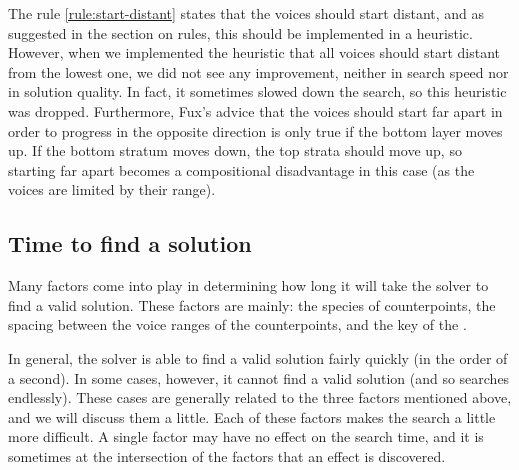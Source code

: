 The rule \ref{rule:start-distant} states that the voices should start distant, and as suggested in the section on rules, this should be implemented in a heuristic. However, when we implemented the heuristic that all voices should start distant from the lowest one, we did not see any improvement, neither in search speed nor in solution quality. In fact, it sometimes slowed down the search, so this heuristic was dropped. Furthermore, Fux's advice that the voices should start far apart in order to progress in the opposite direction is only true if the bottom layer moves up. If the bottom stratum moves down, the top strata should move up, so starting far apart becomes a compositional disadvantage in this case (as the voices are limited by their range).



\subsection{Time to find a solution} \label{section:time-to-find-a-solution}
Many factors come into play in determining how long it will take the solver to find a valid solution. These factors are mainly: the species of counterpoints, the spacing between the voice ranges of the counterpoints, and the key of the \cf.


In general, the solver is able to find a valid solution fairly quickly (in the order of a second). In some cases, however, it cannot find a valid solution (and so searches endlessly). These cases are generally related to the three factors mentioned above, and we will discuss them a little. Each of these factors makes the search a little more difficult. A single factor may have no effect on the search time, and it is sometimes at the intersection of the factors that an effect is discovered.

